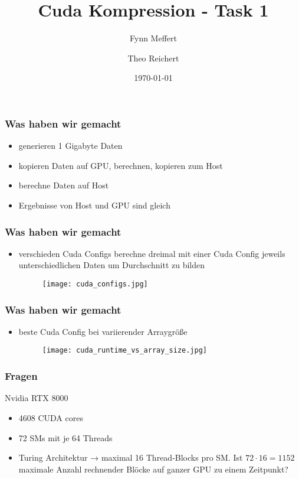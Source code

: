 \documentclass{beamer}
\title{Cuda Kompression - Task 1}
\author{Fynn Meffert \and Theo Reichert}
\date{\today}
\begin{document}
\frame{\titlepage}

\begin{frame}
    \frametitle{Was haben wir gemacht}
    \begin{itemize}
        \item generieren 1 Gigabyte Daten
        \item kopieren Daten auf GPU, berechnen, kopieren zum Host
        \item berechne Daten auf Host
        \item Ergebnisse von Host und GPU sind gleich
     \end{itemize}
\end{frame}

\begin{frame}
    \frametitle{Was haben wir gemacht}
    \begin{itemize}
        \item verschieden Cuda Configs
              berechne dreimal mit einer Cuda Config jeweils unterschiedlichen Daten
              um Durchschnitt zu bilden
         \begin{figure}
             \centering
             \texttt{[image: cuda\_configs.jpg]} %
         \end{figure}
    \end{itemize}
\end{frame}

\begin{frame}
    \frametitle{Was haben wir gemacht}
    \begin{itemize}
        \item beste Cuda Config bei variierender Arraygröße
          \begin{figure}
              \centering
              \texttt{[image: cuda\_runtime\_vs\_array\_size.jpg]}
          \end{figure}
    \end{itemize}
\end{frame}

\begin{frame}
    \frametitle{Fragen}
    Nvidia RTX 8000
    \begin{itemize}
        \item 4608 CUDA cores
        \item 72 SMs mit je 64 Threads
        \item Turing Architektur → maximal 16 Thread-Blocks pro SM.
              Ist $72 \cdot 16 = 1152$ maximale Anzahl rechnender Blöcke
              auf ganzer GPU zu einem Zeitpunkt?
    \end{itemize}
\end{frame}
\end{document}
